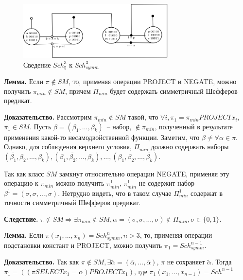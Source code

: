 \documentclass[12pt]{article}
\begin{document}
\begin{figure}[htb]
\centering
\includegraphics[width=0.7\textwidth]{scheff5.png}
\caption{Сведение $Sch_5^3$ к $Sch_{symm}^3$}
\label{fig:scheff3_5}
\end{figure}



\label{eq:lemma_sm}
\textbf{Лемма.} Если $\pi \notin SM$, то, применяя операции PROJECT и NEGATE,
можно получить $\pi_{min} \notin SM$, причем $\Pi_{min}$ будет содержать симметричный Шефферов предикат.

\textbf{Доказательство.} Рассмотрим $\pi_{min} \notin SM$ такой, что $\forall i, \pi_1 = \pi_{min} PROJECT x_i$, $\pi_1 \in SM$.
Пусть $\beta = (\beta_1, \dots, \beta_k)$~-- набор, $\notin \pi_{min}$, полученный в результате применения какой-то несамодвойственной функции.
Заметим, что $\beta \neq \forall \alpha \in \pi$. Однако, для соблюдения верхнего условия, $\Pi_{min}$ должно содержать наборы 
$(\bar{\beta_1}, \beta_2, \dots, \beta_k), (\beta_1, \bar{\beta_2}, \dots, \beta_k), \dots, (\beta_1, \beta_2, \dots, \bar{\beta_k})$.

Так как класс $SM$ замкнут относительно операции NEGATE, применяя эту операцию к $\pi_{min}$ можно получить $\pi_{min}^1$,
$\pi_{min}^1$ не содержит набор $\beta^1 = (\sigma, \sigma, \dots, \sigma)$. 
Нетрудно видеть, 
что в таком случае $\Pi_{min}^1$ содержат в точности симметричный Шефферов предикат.

\textbf{Следствие.} $\pi \notin SM \Longrightarrow \exists \pi_{min} \notin SM, \alpha = (\sigma, \sigma, \dots, \sigma) \notin \Pi_{min}, \sigma \in \{0, 1\}$.

\label{eq:svedenie}
\textbf{Лемма.} Если $\pi(x_1, \dots, x_n) = Sch_{symm}^n, n > 3$, то, применяя операции подстановки констант и PROJECT, можно
получить $\pi_1 = Sch_{symm}^{n-1}$.

\textbf{Доказательство.} Так как 
$\pi \notin SM, \exists \widetilde{\alpha} = (\bar{\alpha}, \dots, \bar{\alpha})$, $\pi$ не сохраняет $\widetilde{\alpha}$.
Тогда 
$\pi_1 = ( (\pi SELECT x_1=\bar{\alpha})  PROJECT  x_1 )$, где $\pi_1(x_1, \dots, x_{n-1}) = Sch^{n-1}$
\end{document}
